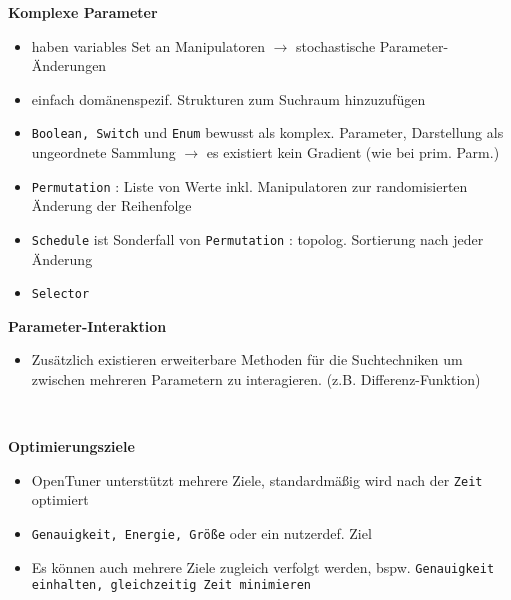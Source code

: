   \begin{frame}
    \textbf{Komplexe Parameter}
    \begin{itemize}
      \item haben variables Set an Manipulatoren $\rightarrow$ stochastische Parameter-Änderungen
      \item einfach domänenspezif. Strukturen zum Suchraum hinzuzufügen
      \item \texttt{Boolean, Switch} und \texttt{Enum} bewusst als komplex. Parameter, Darstellung
      als ungeordnete Sammlung $\rightarrow$ es existiert kein Gradient (wie bei prim. Parm.)
      \item \texttt{Permutation} : Liste von Werte inkl. Manipulatoren zur randomisierten Änderung der Reihenfolge
      \item \texttt{Schedule} ist Sonderfall von \texttt{Permutation} : topolog. Sortierung nach jeder Änderung
      \item \texttt{Selector}
    \end{itemize}
  \end{frame}
  
  \begin{frame}
  \textbf{Parameter-Interaktion}
    \begin{itemize}
      \item Zusätzlich existieren erweiterbare Methoden für die Suchtechniken um zwischen mehreren Parametern 
    zu interagieren. (z.B. Differenz-Funktion)
    \end{itemize}
    
    \textbf{\\}
  
  \textbf{Optimierungsziele}
    \begin{itemize}
      \item OpenTuner unterstützt mehrere Ziele, standardmäßig wird nach der \texttt{Zeit} optimiert
      \item \texttt{Genauigkeit, Energie, Größe} oder ein nutzerdef. Ziel
      \item Es können auch mehrere Ziele zugleich verfolgt werden, bspw. \texttt{Genauigkeit einhalten, gleichzeitig
      Zeit minimieren}
    \end{itemize}
  \end{frame}
    
